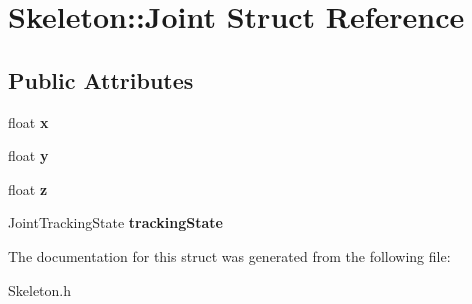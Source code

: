 \hypertarget{structSkeleton_1_1Joint}{
\section{Skeleton::Joint Struct Reference}
\label{structSkeleton_1_1Joint}
}
\subsection*{Public Attributes}
\begin{DoxyCompactItemize}
\item 
\hypertarget{structSkeleton_1_1Joint_a6f748e9c5bdc98c4ddf9f0dde83de829}{
float {\bfseries x}}
\label{structSkeleton_1_1Joint_a6f748e9c5bdc98c4ddf9f0dde83de829}

\item 
\hypertarget{structSkeleton_1_1Joint_af4e26795c972e5799abde731032e34f2}{
float {\bfseries y}}
\label{structSkeleton_1_1Joint_af4e26795c972e5799abde731032e34f2}

\item 
\hypertarget{structSkeleton_1_1Joint_a733932db492df64c8983311934c8cef5}{
float {\bfseries z}}
\label{structSkeleton_1_1Joint_a733932db492df64c8983311934c8cef5}

\item 
\hypertarget{structSkeleton_1_1Joint_ad15bd6487403127f28e9a437cc04e91a}{
JointTrackingState {\bfseries trackingState}}
\label{structSkeleton_1_1Joint_ad15bd6487403127f28e9a437cc04e91a}

\end{DoxyCompactItemize}


The documentation for this struct was generated from the following file:\begin{DoxyCompactItemize}
\item 
Skeleton.h\end{DoxyCompactItemize}
